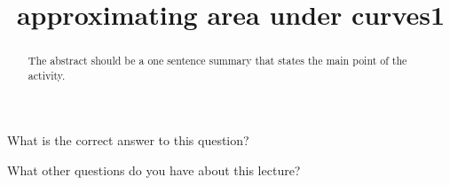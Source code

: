 \documentclass{ximera}
\title{approximating area under curves1}
\begin{document}
\begin{abstract}
  The abstract should be a one sentence summary that states the main point of the activity.
\end{abstract}

\maketitle

\begin{question}
  What is the correct answer to this question?

  \begin{solution}
    \begin{multiple-choice}
    \end{multiple-choice}  
  \end{solution}
\end{question}

What other questions do you have about this lecture?
\begin{free-response}
\end{free-response}
\end{document}
